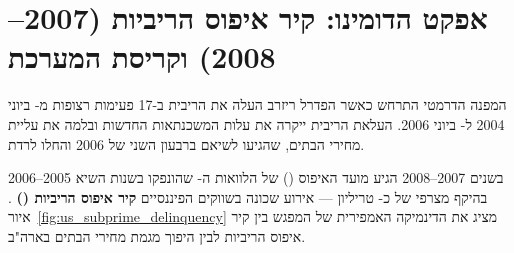 \section{אפקט הדומינו: קיר איפוס הריביות (\num{2007}--\num{2008}) וקריסת המערכת}
\label{sec:subprime_domino}

המפנה הדרמטי התרחש כאשר הפדרל ריזרב העלה את הריבית ב-\num{17} פעימות רצופות מ- ביוני \num{2004} ל- ביוני \num{2006}. העלאת הריבית ייקרה את עלות המשכנתאות החדשות ובלמה את עליית מחירי הבתים, שהגיעו לשיאם ברבעון השני של \num{2006} והחלו לרדת.

בשנים \num{2007}--\num{2008} הגיע מועד האיפוס () של הלוואות ה- שהונפקו בשנות השיא \num{2005}--\num{2006} בהיקף מצרפי של כ- טריליון — אירוע שכונה בשווקים הפיננסיים \textbf{קיר איפוס הריביות ()} \cite{mayer2009rise,foote2008subprime}. איור~\ref{fig:us_subprime_delinquency} מציג את הדינמיקה האמפירית של המפגש בין קיר איפוס הריביות לבין היפוך מגמת מחירי הבתים בארה"ב.

